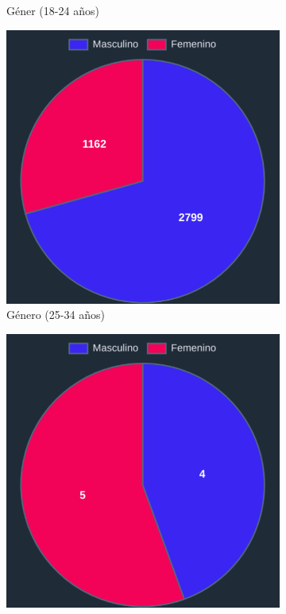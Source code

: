 \begin{figure}[H]
\begin{subfigure}{0.3\textwidth}
  \caption{Géner (18-24 años)}
  \end{subfigure}
  \begin{subfigure}{0.3\textwidth}
   \includegraphics[width=\textwidth]{imaxes/capturas-app/graficos/modaresi/grafico-genero-j.png}
  \caption{Género (25-34 años)}
  \end{subfigure}
  \begin{subfigure}{0.3\textwidth}
   \includegraphics[width=\textwidth]{imaxes/capturas-app/graficos/modaresi/grafico-genero-v.png}

\end{subfigure}
\end{figure}
